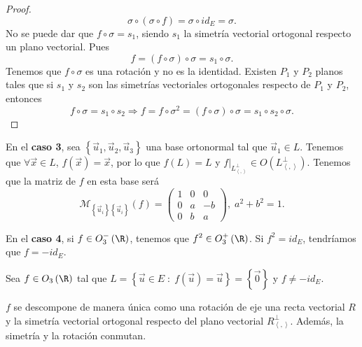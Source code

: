 \begin{description}
\begin{proof}
	\[\sigma\circ\left(\sigma\circ f\right) = \sigma\circ id _{E} = \sigma  .\]
	No se puede dar que $\displaystyle f\circ \sigma = s_{1} $, siendo $\displaystyle s_{1} $ la simetría vectorial ortogonal respecto un plano vectorial. Pues
	\[f = \left(f\circ \sigma \right)\circ \sigma = s_{1} \circ \sigma  .\]
Tenemos que $\displaystyle f \circ \sigma  $ es una rotación y no es la identidad. Existen $\displaystyle P_{1} $ y $\displaystyle P_{2} $ planos tales que si $\displaystyle s_{1} $ y $\displaystyle s_{2} $ son las simetrías vectoriales ortogonales respecto de $\displaystyle P_{1} $ y $\displaystyle P_{2} $, entonces	
\[f\circ \sigma = s_{1}\circ s_{2} \Rightarrow f = f\circ \sigma^{2} = \left(f\circ \sigma \right)\circ \sigma = s_{1}\circ s_{2}\circ \sigma  .\]
\end{proof}
\end{description}
\begin{observation}
	\normalfont En el \textbf{caso 3}, sea $\displaystyle \left\{ \vec{u}_{1}, \vec{u}_{2}, \vec{u}_{3}\right\}  $ una base ortonormal tal que $\displaystyle \vec{u}_{1} \in L $. Tenemos que $\displaystyle \forall \vec{x} \in L $, $\displaystyle f\left(\vec{x}\right) = \vec{x} $, por lo que $\displaystyle f\left(L\right) = L $ y $\displaystyle f|_{L^{\perp }_{\left\langle ,  \right\rangle }} \in O\left(L^{\perp }_{\left\langle ,  \right\rangle }\right)$. Tenemos que la matriz de $\displaystyle f $ en esta base será
	\[\mathcal{M}_{ \left\{ \vec{u}_{i}\right\} \left\{ \vec{u}_{i}\right\} }\left(f\right) = \begin{pmatrix} 1 & 0 & 0 \\ 0 & a & -b \\ 0 & b & a \end{pmatrix}, \; a^{2} + b^{2}=1 .\]
\end{observation}
\begin{observation}
\normalfont En el \textbf{caso 4}, si $\displaystyle f \in O^{-}_{3}\left(\R\right) $, tenemos que $\displaystyle f^{2} \in O^{+}_{3}\left(\R\right) $. Si $\displaystyle f^{2} = id _{E} $, tendríamos que $\displaystyle f = - id _{E} $.
\end{observation}
Sea $\displaystyle f \in O_{3}\left(\R\right) $ tal que $\displaystyle L = \left\{ \vec{u} \in E \; : \; f\left(\vec{u}\right) = \vec{u}\right\}  = \left\{ \vec{0}\right\}  $ y $\displaystyle f \neq -id _{E} $.
\begin{ftheorem}[]
\normalfont $\displaystyle f $ se descompone de manera única como una rotación de eje una recta vectorial $\displaystyle R $ y la simetría vectorial ortogonal respecto del plano vectorial $\displaystyle R^{\perp }_{\left\langle ,  \right\rangle } $. Además, la simetría y la rotación conmutan.
\end{ftheorem}
